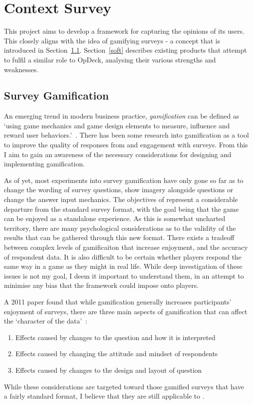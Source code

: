 \chapter{Context Survey}

This project aims to develop a framework for capturing the opinions of its users. This closely aligns with the idea of gamifying surveys - a concept that is introduced in Section~\ref{surgam}. Section~\ref{soft} describes existing products that attempt to fulfil a similar role to OpDeck, analysing their various strengths and weaknesses.

\section{Survey Gamification}\label{surgam}
An emerging trend in modern business practice, \textit{gamification} can be defined as `using game mechanics and game design elements to measure, influence and reward user behaviors.'~\cite{7804551}. 
There has been some research into gamification as a tool to improve the quality of responses from and engagement with surveys. From this I aim to gain an awareness of the necessary considerations for designing and implementing gamification.

As of yet, most experiments into survey gamification have only gone so far as to change the wording of survey questions, show imagery alongside questions or change the answer input mechanics.
The objectives of \od{} represent a considerable departure from the standard survey format, with the goal being that the game can be enjoyed as a standalone experience. 
As this is somewhat uncharted territory, there are many psychological considerations as to the validity of the results that can be gathered through this new format. 
There exists a tradeoff between complex levels of gamificaiton that increase enjoyment, and the accuracy of respondent data. 
It is also difficult to be certain whether players respond the same way in a game as they might in real life.
While deep investigation of these issues is not my goal, I deem it important to understand them, in an attempt to minimise any bias that the \od{} framework could impose onto players.

A 2011 paper found that while gamification generally increases participants' enjoyment of surveys, there are three main aspects of gamification that can affect the `character of the data'~\cite{GameExperiments}:
\begin{enumerate}[label=\textbf{e.\arabic*}]
    \item\label{cd:q} Effects caused by changes to the question and how it is interpreted
    \item\label{cd:m} Effects caused by changing the attitude and mindset of respondents
    \item\label{cd:l} Effects caused by changes to the design and layout of question
\end{enumerate}
While these considerations are targeted toward those gamified surveys that have a fairly standard format, I believe that they are still applicable to \od. 

